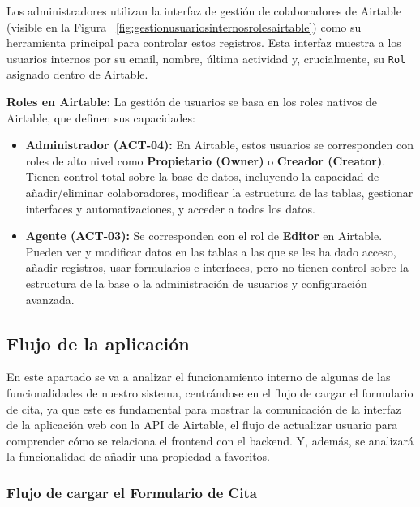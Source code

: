 Los administradores utilizan la interfaz de gestión de colaboradores de Airtable (visible en la Figura ~\ref{fig:gestionusuariosinternosrolesairtable}) como su herramienta principal para controlar estos registros. Esta interfaz muestra a los usuarios internos por su email, nombre, última actividad y, crucialmente, su \texttt{Rol} asignado dentro de Airtable.

\textbf{Roles en Airtable:} La gestión de usuarios se basa en los roles nativos de Airtable, que definen sus capacidades:

\begin{itemize}
    \item \textbf{Administrador (ACT-04):} En Airtable, estos usuarios se corresponden con roles de alto nivel como \textbf{Propietario (Owner)} o \textbf{Creador (Creator)}. Tienen control total sobre la base de datos, incluyendo la capacidad de añadir/eliminar colaboradores, modificar la estructura de las tablas, gestionar interfaces y automatizaciones, y acceder a todos los datos.

    \item \textbf{Agente (ACT-03):} Se corresponden con el rol de \textbf{Editor} en Airtable. Pueden ver y modificar datos en las tablas a las que se les ha dado acceso, añadir registros, usar formularios e interfaces, pero no tienen control sobre la estructura de la base o la administración de usuarios y configuración avanzada.
\end{itemize}





\subsection{Flujo de la aplicación}


En este apartado se va a analizar el funcionamiento interno de algunas de las funcionalidades de nuestro sistema, centrándose en el flujo de cargar el formulario de cita, ya que este es fundamental para mostrar la comunicación de la interfaz de la aplicación web con la API de Airtable, el flujo de actualizar usuario para comprender cómo se relaciona el frontend con el backend. Y, además, se analizará la funcionalidad de añadir una propiedad a favoritos.


\subsubsection{Flujo de cargar el Formulario de Cita}


